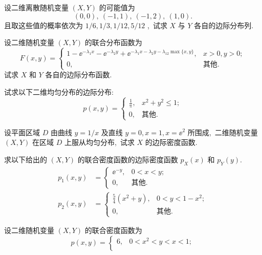    \begin{xiti}
   		\item 设二维离散随机变量 $(X,Y)$ 的可能值为
   		\begin{equation*}
   			(0,0),\ (-1,1),\ (-1,2),\ (1,0).
   		\end{equation*}
   		且取这些值的概率依次为 $1/6,1/3,1/12,5/12$ ,\ 试求 $X$ 与 $Y$ 各自的边际分布列.
   		\item 设二维随机变量 $(X,Y)$ 的联合分布函数为
   		\begin{equation*}
   			F(x,y)=\begin{cases}
   			1-\ee^{-\lambda_{1}x}-\ee^{-\lambda_{2}y}+\ee^{-\lambda_{1}x-\lambda_{2}y-\lambda_{12}\max\{x,y\}}, & x>0,y>0;\\
   			0, & \text{其他}.
   			\end{cases}
   		\end{equation*}
   		试求 $X$ 和 $Y$ 各自的边际分布函数.
   		\item 试求以下二维均匀分布的边际分布:
   		\begin{equation*}
   			p(x,y)=\begin{cases}
   			\frac{1}{\uppi}, & x^2+y^2\leqslant1;\\
   			0, & \text{其他}.
   			\end{cases}
   		\end{equation*}
   		\item 设平面区域 $D$ 由曲线 $y=1/x$ 及直线 $y=0,x=1,x=\ee^2$ 所围成,\ 二维随机变量 $(X,Y)$ 在区域 $D$ 上服从均匀分布,\ 试求 $X$ 的边际密度函数.
   		\item 求以下给出的 $(X,Y)$ 的联合密度函数的边际密度函数 $p_{X}(x)$ 和 $p_{Y}(y)$.
   		\begin{align*}
   			p_{1}(x,y) &= \begin{cases}
   			\ee^{-y}, & 0<x<y;\\
   			0, & \text{其他}.
   			\end{cases}\\
   			p_{2}(x,y) &= \begin{cases}
   			\frac{5}{4}(x^2+y), & 0<y<1-x^2;\\
   			0, & \text{其他}.
   			\end{cases}
   		\end{align*}
   		\item 设二维随机变量 $(X,Y)$ 的联合密度函数为
   		\begin{equation*}
   			p(x,y)=\begin{cases}
   			6, & 0<x^2<y<x<1;\\

\end{cases}
\end{equation*}
\end{xiti}
